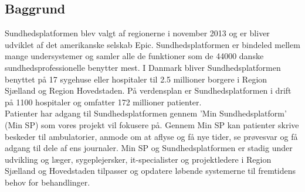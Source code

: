 \subsection{Baggrund}
Sundhedsplatformen blev valgt af regionerne i november 2013 og er bliver udviklet af det amerikanske selskab Epic. Sundhedsplatformen er bindeled mellem mange undersystemer og samler alle de funktioner som de 44000 danske sundhedsprofessionelle benytter mest. I Danmark bliver Sundhedsplatformen benyttet på 17 sygehuse eller hospitaler til 2.5 millioner borgere i Region Sjælland og Region Hovedstaden. På verdensplan er Sundhedsplatformen i drift på 1100 hospitaler og omfatter 172 millioner patienter.\\
Patienter har adgang til Sundhedsplatformen gennem 'Min Sundhedsplatform' (Min SP) som vores projekt vil fokusere på. Gennem Min SP kan patienter skrive beskeder til ambulatorier, anmode om at aflyse og få nye tider, se prøvesvar og få adgang til dele af ens journaler. Min SP og Sundhedsplatformen er stadig under udvikling og læger, sygeplejersker, it-specialister og projektledere i Region Sjælland og Hovedstaden tilpasser og opdatere løbende systemerne til fremtidens behov for behandlinger.

